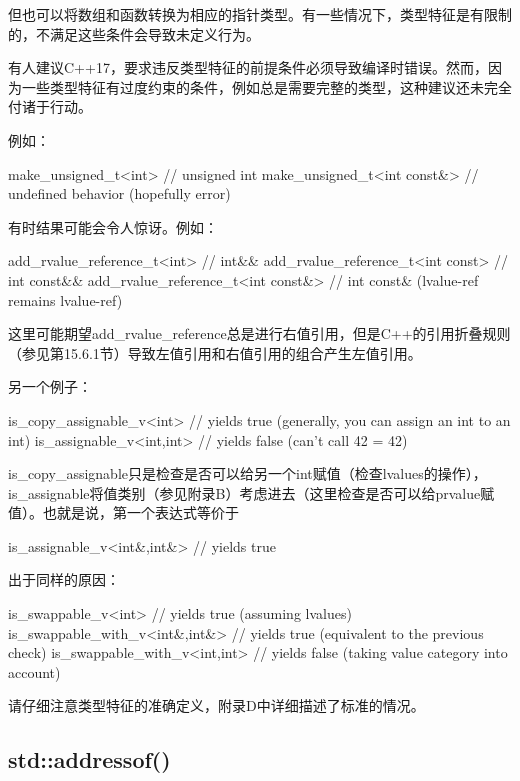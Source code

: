 但也可以将数组和函数转换为相应的指针类型。有一些情况下，类型特征是有限制的，不满足这些条件会导致未定义行为。

\begin{notice}
有人建议C++17，要求违反类型特征的前提条件必须导致编译时错误。然而，因为一些类型特征有过度约束的条件，例如总是需要完整的类型，这种建议还未完全付诸于行动。
\end{notice}

例如：

\begin{cpp}
make_unsigned_t<int> // unsigned int
make_unsigned_t<int const&> // undefined behavior (hopefully error)
\end{cpp}

有时结果可能会令人惊讶。例如：

\begin{cpp}
add_rvalue_reference_t<int> // int&&
add_rvalue_reference_t<int const> // int const&&
add_rvalue_reference_t<int const&> // int const& (lvalue-ref remains lvalue-ref)
\end{cpp}

这里可能期望add\_rvalue\_reference总是进行右值引用，但是C++的引用折叠规则（参见第15.6.1节）导致左值引用和右值引用的组合产生左值引用。

另一个例子：

\begin{cpp}
is_copy_assignable_v<int> // yields true (generally, you can assign an int to an int)
is_assignable_v<int,int> // yields false (can't call 42 = 42)
\end{cpp}

is\_copy\_assignable只是检查是否可以给另一个int赋值（检查lvalues的操作），is\_assignable将值类别（参见附录B）考虑进去（这里检查是否可以给prvalue赋值）。也就是说，第一个表达式等价于

\begin{cpp}
is_assignable_v<int&,int&> // yields true
\end{cpp}

出于同样的原因：

\begin{cpp}
is_swappable_v<int> // yields true (assuming lvalues)
is_swappable_with_v<int&,int&> // yields true (equivalent to the previous check)
is_swappable_with_v<int,int> // yields false (taking value category into account)
\end{cpp}

请仔细注意类型特征的准确定义，附录D中详细描述了标准的情况。

\subsection{std::addressof()}

